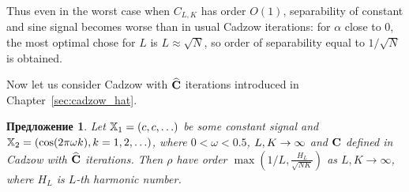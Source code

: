\documentclass[12pt,a4paper,fleqn,leqno]{article}
\newtheorem{proposition}{Предложение}
\begin{document}
Thus even in the worst case when $C_{L,K}$ has order $O(1)$, separability of constant and sine signal becomes worse than in usual Cadzow iterations: for $\alpha$ close to 0, the most optimal chose for $L$ is $L \approx \sqrt{N}$, so order of separability equal to $1/\sqrt{N}$ is obtained.

Now let us consider Cadzow with $\widehat{\mathbf{C}}$ iterations introduced in Chapter~\ref{sec:cadzow_hat}.

\begin{proposition}
\label{prop:separ2}
Let $\mathbb{X}_1 = (c, c, \ldots)$ be some constant signal and $\mathbb{X}_2 = (\cos(2 \pi \omega k), k = 1, 2, \ldots)$, where $0<\omega <0.5$, $L,K\rightarrow \infty$ and $\mathbf{C}$ defined in Cadzow with $\widehat{\mathbf{C}}$ iterations.
 Then $\rho$ have order $\max \left(1/L, \frac{H_L}{\sqrt{NK}} \right)$ as $L, K \to \infty$, where $H_L$ is $L$-th harmonic number.
\end{proposition}
\end{document}
